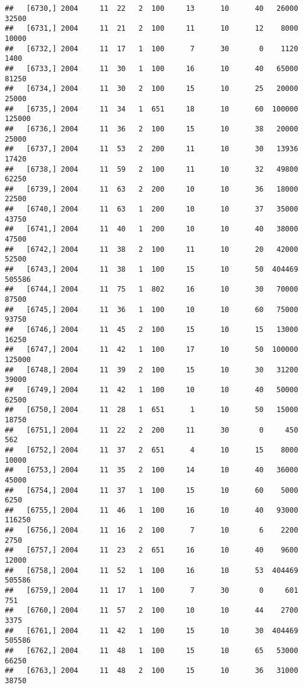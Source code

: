\documentclass{article}\usepackage[]{graphicx}\usepackage[]{color}
\makeatletter
\newenvironment{kframe}{%
 \def\at@end@of@kframe{}%
 \ifinner\ifhmode%
  \def\at@end@of@kframe{\end{minipage}}%
  \begin{minipage}{\columnwidth}%
 \fi\fi%
 \def\FrameCommand##1{\hskip\@totalleftmargin \hskip-\fboxsep
 \colorbox{shadecolor}{##1}\hskip-\fboxsep
     \hskip-\linewidth \hskip-\@totalleftmargin \hskip\columnwidth}%
 \MakeFramed {\advance\hsize-\width
   \@totalleftmargin\z@ \linewidth\hsize
   \@setminipage}}%
 {\par\unskip\endMakeFramed%
 \at@end@of@kframe}
\newenvironment{knitrout}{}{} %
\makeatother
\begin{document}
\begin{knitrout}
\begin{kframe}
\begin{verbatim}
##   [6730,] 2004     11  22   2  100     13      10      40   26000   32500
##   [6731,] 2004     11  21   2  100     11      10      12    8000   10000
##   [6732,] 2004     11  17   1  100      7      30       0    1120    1400
##   [6733,] 2004     11  30   1  100     16      10      40   65000   81250
##   [6734,] 2004     11  30   2  100     15      10      25   20000   25000
##   [6735,] 2004     11  34   1  651     18      10      60  100000  125000
##   [6736,] 2004     11  36   2  100     15      10      38   20000   25000
##   [6737,] 2004     11  53   2  200     11      10      30   13936   17420
##   [6738,] 2004     11  59   2  100     11      10      32   49800   62250
##   [6739,] 2004     11  63   2  200     10      10      36   18000   22500
##   [6740,] 2004     11  63   1  200     10      10      37   35000   43750
##   [6741,] 2004     11  40   1  200     10      10      40   38000   47500
##   [6742,] 2004     11  38   2  100     11      10      20   42000   52500
##   [6743,] 2004     11  38   1  100     15      10      50  404469  505586
##   [6744,] 2004     11  75   1  802     16      10      30   70000   87500
##   [6745,] 2004     11  36   1  100     10      10      60   75000   93750
##   [6746,] 2004     11  45   2  100     15      10      15   13000   16250
##   [6747,] 2004     11  42   1  100     17      10      50  100000  125000
##   [6748,] 2004     11  39   2  100     15      10      30   31200   39000
##   [6749,] 2004     11  42   1  100     10      10      40   50000   62500
##   [6750,] 2004     11  28   1  651      1      10      50   15000   18750
##   [6751,] 2004     11  22   2  200     11      30       0     450     562
##   [6752,] 2004     11  37   2  651      4      10      15    8000   10000
##   [6753,] 2004     11  35   2  100     14      10      40   36000   45000
##   [6754,] 2004     11  37   1  100     15      10      60    5000    6250
##   [6755,] 2004     11  46   1  100     16      10      40   93000  116250
##   [6756,] 2004     11  16   2  100      7      10       6    2200    2750
##   [6757,] 2004     11  23   2  651     16      10      40    9600   12000
##   [6758,] 2004     11  52   1  100     16      10      53  404469  505586
##   [6759,] 2004     11  17   1  100      7      30       0     601     751
##   [6760,] 2004     11  57   2  100     10      10      44    2700    3375
##   [6761,] 2004     11  42   1  100     15      10      30  404469  505586
##   [6762,] 2004     11  48   1  100     15      10      65   53000   66250
##   [6763,] 2004     11  48   2  100     15      10      36   31000   38750

\end{verbatim}
\end{kframe}
\end{knitrout}
\end{document}

